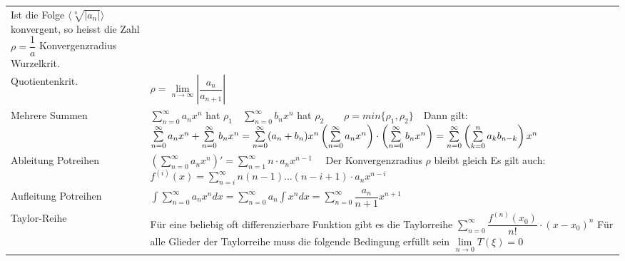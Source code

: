 \begin{table}[h!]
\begin{center}
\begin{tabularx}{540pt}{|p{100pt}|X|}
	Ist die Folge $\langle \sqrt[n]{|a_n|} \rangle$ konvergent, so heisst die Zahl $\rho=\dfrac{1}{a}$ Konvergenzradius Wurzelkrit.\\
	Quotientenkrit.&
	$\rho=\lim\limits_{n\to\infty}\left\lvert\dfrac{a_n}{a_{n+1}}\right\lvert$\\
	
	Mehrere Summen&
	$\sum\limits_{n=0}^{\infty}a_nx^n$ hat $\rho_1 \quad \sum\limits_{n=0}^{\infty}b_nx^n$ hat $\rho_2 \qquad
	\rho = min\{\rho_1, \rho_2\} \quad $Dann gilt:\newline
	$\sum\limits_{n=0}^{\infty}a_nx^n+\sum\limits_{n=0}^{\infty}b_nx^n = \sum\limits_{n=0}^{\infty}(a_n+b_n)x^n \newline 
	\left(\sum\limits_{n=0}^{\infty}a_nx^n\right)\cdot\left(\sum\limits_{n=0}^{\infty}b_nx^n\right)= \sum\limits_{n=0}^{\infty}\left(\sum\limits_{k=0}^{n}a_kb_{n-k}\right)x^n$\\
\hline
	Ableitung Potreihen&
	$\left(\sum\limits_{n=0}^{\infty}a_nx^n\right)'=\sum\limits_{n=1}^{\infty}n\cdot a_nx^{n-1}\quad$ Der Konvergenzradius $\rho$ bleibt gleich\newline
	Es gilt auch: $f^{(i)}(x)=\sum\limits_{n=i}^{\infty}n(n-1)\ldots(n-i+1)\cdot a_nx^{n-i}$\\
\hline

	Aufleitung Potreihen&
	$\int\sum\limits_{n=0}^{\infty}a_nx^ndx=\sum\limits_{n=0}^{\infty}a_n\int x^ndx=\sum\limits_{n=0}^{\infty}\dfrac{a_n}{n+1}x^{n+1}$\\
\hline
	Taylor-Reihe&
	Für eine beliebig oft differenzierbare Funktion gibt es die Taylorreihe $\sum\limits_{n=0}^{\infty}\dfrac{f^{(n)}(x_0)}{n!}\cdot (x-x_0)^n$\newline
	Für alle Glieder der Taylorreihe muss die folgende Bedingung erfüllt sein $\lim\limits_{n\to 0} T(\xi)=0 $\\
\hline
\end{tabularx}	


\end{center}
\end{table}	

